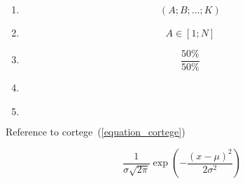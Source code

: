 \documentclass[11pt,twoside]{article}
\begin{document}
    \begin{enumerate}
        \item \begin{equation}
                  \label{equation_cortege}
                  (A;B;\dots;K)
        \end{equation}

        \item \begin{equation}
                  \label{equation_aRange}
                  A\in[1;N]
        \end{equation}

        \item \begin{equation}
                  \label{equation_halfOnHalf}
                  \frac{50\%}{50\%}
        \end{equation}

        \item \item \begin{equation}
                  \label{equation_}

        \end{equation}

    \end{enumerate}

    \noindent\makebox[\linewidth]{\rule{\paperwidth}{0.4pt}}

    Reference to cortege~(\ref{equation_cortege})

    \noindent\makebox[\linewidth]{\rule{\paperwidth}{0.4pt}}

    \begin{equation}
        \label{eq:normal_dist}
        \frac{1}{\sigma\sqrt{2\pi}}
        \exp\left(-\frac{(x-\mu)^2}{2\sigma^2}\right)
    \end{equation}
\end{document}
